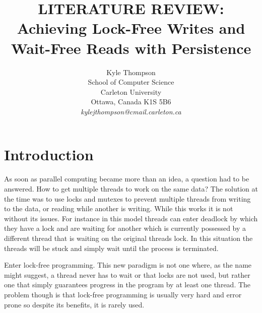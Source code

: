 \documentclass[11pt]{article}       %
\begin{document}


\title{LITERATURE REVIEW:  Achieving Lock-Free Writes and Wait-Free Reads with Persistence}


\author{
Kyle Thompson\\
School of Computer Science\\
Carleton University\\
Ottawa, Canada K1S 5B6\\
{\em kylejthompson@cmail.carleton.ca}
} %

\maketitle



\section{Introduction} \label{intro}

As soon as parallel computing became more than an idea, a question had to be answered. How to
get multiple threads to work on the same data? The solution at the time was to use locks and mutexes 
to prevent multiple threads from writing to the data, or reading while another is writing. While this works 
it is not without its issues. For instance in this model threads can enter deadlock by which they have a 
lock and are waiting for another which is currently possessed by a different 
thread that is waiting on the original threads lock. In this situation the threads will be stuck and simply 
wait until the process is terminated.

Enter lock-free programming. This new paradigm is not one where, as the name might suggest,
a thread never has to wait or that locks are not used, but rather one that simply guarantees
progress in the program by at least one thread. The problem though is that lock-free 
programming is usually very hard and error prone so despite its benefits, it is rarely used.
\end{document}
